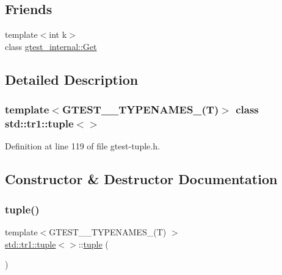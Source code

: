 \subsection*{Friends}
\begin{DoxyCompactItemize}
\item 
{\footnotesize template$<$int k$>$ }\\class \hyperlink{classstd_1_1tr1_1_1tuple_aeeed38755abdaa78587dd1eac9ccc950}{gtest\+\_\+internal\+::\+Get}
\end{DoxyCompactItemize}


\subsection{Detailed Description}
\subsubsection*{template$<$G\+T\+E\+S\+T\+\_\+\_\+\+T\+Y\+P\+E\+N\+A\+M\+E\+S\+\_\+(\+T)$>$\newline
class std\+::tr1\+::tuple$<$$>$}



Definition at line 119 of file gtest-\/tuple.\+h.



\subsection{Constructor \& Destructor Documentation}
\mbox{\label{classstd_1_1tr1_1_1tuple_adcea1a41d0521157971339d279aad469}} 
\subsubsection{\texorpdfstring{tuple()}{tuple()}\hspace{0.1cm}{\footnotesize\ttfamily [1/4]}}
{\footnotesize\ttfamily template$<$G\+T\+E\+S\+T\+\_\+\_\+\+T\+Y\+P\+E\+N\+A\+M\+E\+S\+\_\+(\+T) $>$ \\
\hyperlink{classstd_1_1tr1_1_1tuple}{std\+::tr1\+::tuple}$<$$>$\+::\hyperlink{classstd_1_1tr1_1_1tuple}{tuple} (\begin{DoxyParamCaption}{ }\end{DoxyParamCaption})\hspace{0.3cm}{\ttfamily [inline]}}



